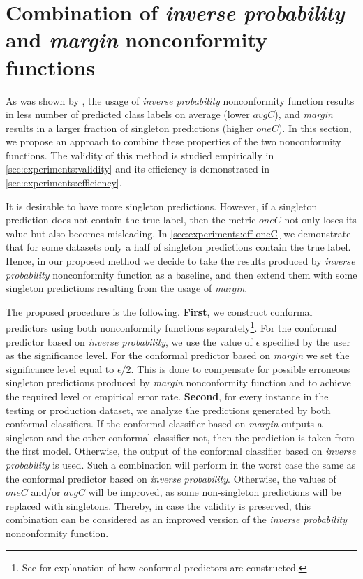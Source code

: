 \section{Combination of \textit{inverse probability} and \textit{margin} nonconformity functions}
\label{sec:our-approach}

As was shown by \cite{johansson2017model}, the usage of \textit{inverse probability}
nonconformity function results in less number of predicted class labels on average 
(lower $avgC$), and \textit{margin} results in a  larger fraction of singleton 
predictions (higher $oneC$). In this section, we propose an approach to combine
these properties of the two nonconformity functions. The validity of this method
is studied empirically in \cref{sec:experiments:validity} and its efficiency is 
demonstrated in \cref{sec:experiments:efficiency}.

It is desirable to have more singleton predictions. However, if a singleton prediction
does not contain the true label, then the metric $oneC$ not only loses its
value but also becomes misleading. In \cref{sec:experiments:eff-oneC} we
demonstrate that for some datasets only a half of singleton predictions contain 
the true label. Hence, in our proposed method we decide to take the 
results produced by \textit{inverse probability} nonconformity function as 
a baseline, and then extend them with some singleton predictions resulting 
from the usage of \textit{margin}. 

The proposed procedure is the following.
\textbf{First}, we construct conformal predictors using both nonconformity 
functions separately\footnote{
See \cite{vovk2005algorithmic,shafer2008tutorial,johansson2017model} for
explanation of how conformal predictors are constructed.
}. For the conformal predictor based on \textit{inverse 
probability}, we use the value of $\epsilon$ specified by the user as the
significance level. 
For the conformal predictor based on \textit{margin}
we set the significance level equal to $\epsilon / 2$. This is done to compensate for possible erroneous singleton
predictions produced by \textit{margin} nonconformity function and to achieve the
required level or empirical error rate. \textbf{Second}, for every instance in
the testing or production dataset, we analyze the predictions generated by both 
conformal classifiers. If the conformal classifier based on \textit{margin} outputs 
a singleton and the other conformal classifier not, then the prediction is
taken from the first model. Otherwise, the output of the conformal classifier 
based on \textit{inverse probability} is used.
Such a combination will perform in the worst case the same as the conformal
predictor based on \textit{inverse probability}. Otherwise, the values of
$oneC$ and/or $avgC$ will be improved, as some non-singleton predictions will
be replaced with singletons. Thereby, in case the validity is preserved, this
combination can be considered as an improved version of the 
\textit{inverse probability} nonconformity function.

